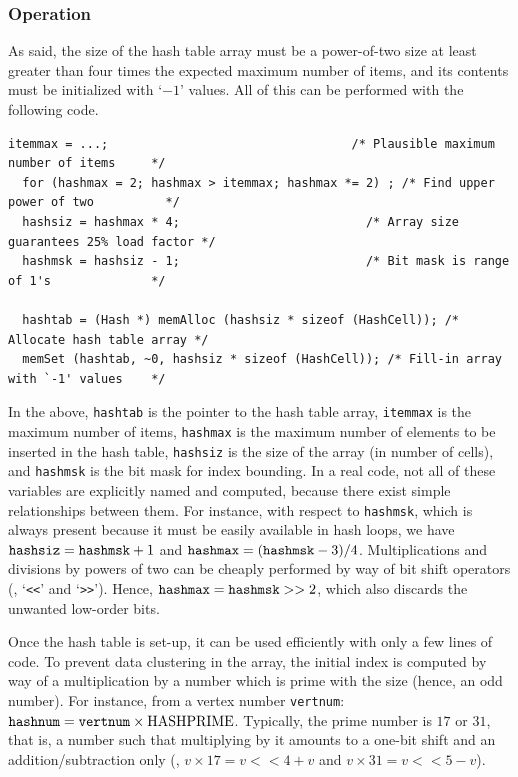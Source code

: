\subsubsection{Operation}

As said, the size of the hash table array must be a
power-of-two size at least greater than four times the expected
maximum number of items, and its contents must be initialized with
`$-1$' values. All of this can be performed with the following code.

\begin{lstlisting}[style=language-c]
  itemmax = ...;                                  /* Plausible maximum number of items     */
  for (hashmax = 2; hashmax > itemmax; hashmax *= 2) ; /* Find upper power of two          */
  hashsiz = hashmax * 4;                          /* Array size guarantees 25% load factor */
  hashmsk = hashsiz - 1;                          /* Bit mask is range of 1's              */

  hashtab = (Hash *) memAlloc (hashsiz * sizeof (HashCell)); /* Allocate hash table array */
  memSet (hashtab, ~0, hashsiz * sizeof (HashCell)); /* Fill-in array with `-1' values    */
\end{lstlisting}

In the above, \texttt{hashtab} is the pointer to the hash table array,
\texttt{itemmax} is the maximum number of items, \texttt{hashmax} is
the maximum number of elements to be inserted in the hash table,
\texttt{hashsiz} is the size of the array (in number of cells), and
\texttt{hashmsk} is the bit mask for index bounding. In a real code,
not all of these variables are explicitly named and computed, because
there exist simple relationships between them. For instance, with
respect to \texttt{hashmsk}, which is always present because it must
be easily available in hash loops, we have
$\mbox{\texttt{hashsiz}} = \mbox{\texttt{hashmsk}} + 1$ and
$\mbox{\texttt{hashmax}} = (\mbox{\texttt{hashmsk}} - 3)/4$.
Multiplications and divisions by powers of two can be cheaply
performed by way of bit shift operators (\ie, `\texttt{<<}' and
`\texttt{>>}'). Hence,
$\mbox{\texttt{hashmax}} = \mbox{\texttt{hashmsk}} > > 2$, which also
discards the unwanted low-order bits.

Once the hash table is set-up, it can be used efficiently with only a
few lines of code. To prevent data clustering in the array, the
initial index is computed by way of a multiplication by a number which
is prime with the size (hence, an odd number). For instance, from a
vertex number \texttt{vertnum}: $\mbox{\texttt{hashnum}} =
\mbox{\texttt{vertnum}} \times \mbox{HASHPRIME}$. Typically, the prime
number is $17$ or $31$, that is, a number such that multiplying by it
amounts to a one-bit shift and an addition/subtraction only (\eg,
$v\times 17 = v < < 4 + v$ and $v\times 31 = v < < 5 - v$).

